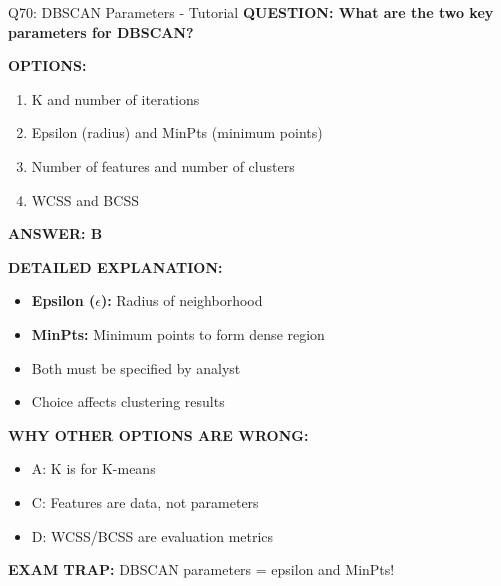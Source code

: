 \documentclass[8pt]{beamer}
\begin{document}
	\begin{frame}{Q70: DBSCAN Parameters - Tutorial}
		\fontsize{6.5}{7.5}\selectfont
		\textbf{QUESTION: What are the two key parameters for DBSCAN?}
		
		\vspace{0.1cm}
		\textbf{OPTIONS:}
		\begin{enumerate}
			\item K and number of iterations
			\item Epsilon (radius) and MinPts (minimum points)
			\item Number of features and number of clusters
			\item WCSS and BCSS
		\end{enumerate}
		
		\vspace{0.1cm}
		\textcolor{myblue}{\textbf{ANSWER: B}}
		
		\vspace{0.1cm}
		\textbf{DETAILED EXPLANATION:}
		\begin{itemize}
			\item \textbf{Epsilon ($\epsilon$):} Radius of neighborhood
			\item \textbf{MinPts:} Minimum points to form dense region
			\item Both must be specified by analyst
			\item Choice affects clustering results
		\end{itemize}
		
		\vspace{0.1cm}
		\textcolor{myred}{\textbf{WHY OTHER OPTIONS ARE WRONG:}}
		\begin{itemize}
			\item \textcolor{myred}{A:} K is for K-means
			\item \textcolor{myred}{C:} Features are data, not parameters
			\item \textcolor{myred}{D:} WCSS/BCSS are evaluation metrics
		\end{itemize}
		
		\textcolor{myred}{\textbf{EXAM TRAP:}} DBSCAN parameters = \textcolor{myblue}{epsilon and MinPts}!
	\end{frame}
	
\end{document}
